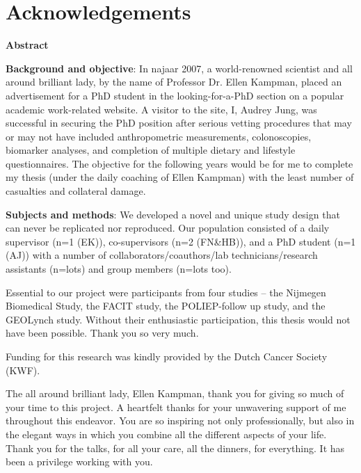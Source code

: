 \chapter*{Acknowledgements}
\label{acknowledgements}


\pagebreak

\noindent \textbf{Abstract}

\noindent \textbf{Background and objective}: In najaar 2007, a world-renowned scientist and all around brilliant lady, by the name of Professor Dr. Ellen Kampman, placed an advertisement for a PhD student in the looking-for-a-PhD section on a popular academic work-related website. A visitor to the site, I, Audrey Jung, was successful in securing the PhD position after serious vetting procedures that may or may not have included anthropometric measurements, colonoscopies, biomarker analyses, and completion of multiple dietary and lifestyle questionnaires. The objective for the following years would be for me to complete my thesis (under the daily coaching of Ellen Kampman) with the least number of casualties and collateral damage.

\noindent \textbf{Subjects and methods}: We developed a novel and unique study design that can never be replicated nor reproduced. Our population consisted of a daily supervisor (n=1 (EK)), co-supervisors (n=2 (FN\&HB)), and a PhD student (n=1 (AJ)) with a number of collaborators/coauthors/lab technicians/research assistants (n=lots) and group members (n=lots too).

\noindent Essential to our project were participants from four studies -- the Nijmegen Biomedical Study, the FACIT study, the POLIEP-follow up study, and the GEOLynch study. Without their enthusiastic participation, this thesis would not have been possible. Thank you so very much.

\noindent Funding for this research was kindly provided by the Dutch Cancer Society (KWF).

\noindent The all around brilliant lady, Ellen Kampman, thank you for giving so much of your time to this project. A heartfelt thanks for your unwavering support of me throughout this endeavor. You are so inspiring not only professionally, but also in the elegant ways in which you combine all the different aspects of your life. Thank you for the talks, for all your care, all the dinners, for everything. It has been a privilege working with you.

